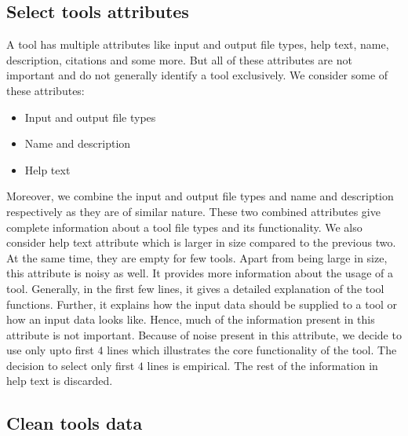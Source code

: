 \subsection{Select tools attributes}
A tool has multiple attributes like input and output file types, help text, name, description, citations and some more. But all of these attributes are not important and do not generally identify a tool exclusively. We consider some of these attributes:
\begin{itemize}
	\item Input and output file types
	\item Name and description
	\item Help text
\end{itemize}
Moreover, we combine the input and output file types and name and description respectively as they are of similar nature. These two combined attributes give complete information about a tool file types and its functionality. We also consider help text attribute which is larger in size compared to the previous two. At the same time, they are empty for few tools. Apart from being large in size, this attribute is noisy as well. It provides more information about the usage of a tool. Generally, in the first few lines, it gives a detailed explanation of the tool functions. Further, it explains how the input data should be supplied to a tool or how an input data looks like. Hence, much of the information present in this attribute is not important. Because of noise present in this attribute, we decide to use only upto first $4$ lines which illustrates the core functionality of the tool. The decision to select only first $4$ lines is empirical. The rest of the information in help text is discarded. 


\subsection{Clean tools data}
